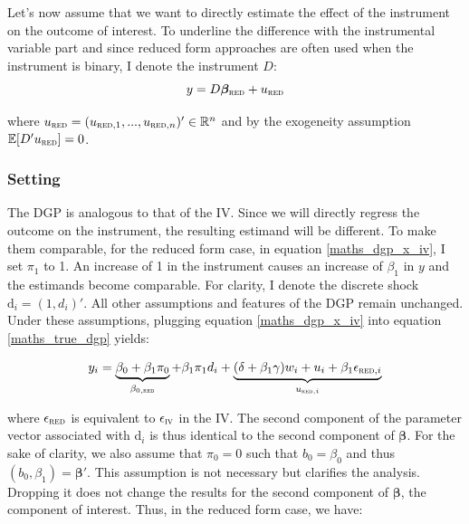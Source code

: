 \documentclass[a4paper, 11pt]{report}
\begin{document}
			Let's now assume that we want to directly estimate the effect of the instrument on the outcome of interest. To underline the difference with the instrumental variable part and since reduced form approaches are often used when the instrument is binary, I denote the instrument $D$:
						~
						\[
							y = D \bm{\beta_{\textsc{red}}} + u_{\textsc{red}}
						\]
					
					where $u_{\textsc{red}} = (u_{\textsc{red}, 1}, ... , u_{\textsc{red}, n})' \in \mathbb{R}^{n}$ and by the exogeneity assumption $\mathbb{E}[D'u_{\textsc{red}}] = 0$.
		
			\subsubsection{Setting}
			
			
				The DGP is analogous to that of the IV. Since we will directly regress the outcome on the instrument, the resulting estimand will be different. To make them comparable, for the reduced form case, in equation \ref{maths_dgp_x_iv}, I set $\pi_{1}$ to 1. An increase of 1 in the instrument causes an increase of $\beta_{1}$ in $y$ and the estimands become comparable. For clarity, I denote the discrete shock $\text{d}_{i} = (1, d_{i})'$. All other assumptions and features of the DGP remain unchanged. Under these assumptions, plugging equation \ref{maths_dgp_x_iv} into equation \ref{maths_true_dgp} yields:
				
				\[
					y_{i} = \underbrace{\beta_{0} + \beta_{1}\pi_0}_{\beta_{0, \textsc{red}}} + \beta_{1}\pi_{1}d_{i} + \underbrace{(\delta + \beta_{1}\gamma) w_{i} + u_{i} + \beta_{1}\epsilon_{\textsc{red}, i}}_{u_{\textsc{red}, i}}
				\]
				
				where $\epsilon_{\textsc{red}}$ is equivalent to $\epsilon_{\textsc{iv}}$ in the IV. The second component of the parameter vector associated with d$_{i}$ is thus identical to the second component of $\bm{\beta}$. For the sake of clarity, we also assume that $\pi_{0} = 0$ such that $b_{0} = \beta_{0}$ and thus $(b_{0}, \beta_{1}) = \bm{\beta}'$. This assumption is not necessary but clarifies the analysis. Dropping it does not change the results for the second component of $\bm{\beta}$, the component of interest. %
				Thus, in the reduced form case, we have:
				
\end{document}
